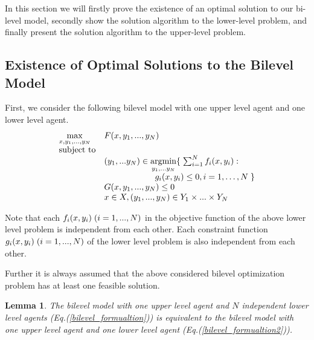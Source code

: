 \documentclass[10pt,journal]{IEEEtran}
\theoremstyle{definition}
\theoremstyle{plain} \newtheorem{theo}{Theorem} \newtheorem{prop}{Proposition}  \newtheorem{lemm}{Lemma}
\begin{document}
In this section we will firstly prove the existence of an optimal solution to our bi-level model, secondly show the solution algorithm to the lower-level problem, and finally present the solution algorithm to the upper-level problem. 









\subsection{Existence of Optimal Solutions to the Bilevel Model} \label{existence}
First, we consider the following bilevel model with one upper level agent and one lower level agent. \\

\vspace{-1cm}
\begin{equation}  \label{bilevel_formualtion2}
\begin{array}{ll} 
\max \limits_{x,y_{1},...,y_N}& F(x,y_{1},...,y_N) \\ 
\hbox{subject to} & \\ 
& (y_1,...y_N) \in \underset{y_1,...y_N} {\operatorname{argmin}} \lbrace \hspace{1mm} \sum_{i=1}^N f_i(x,y_i): \\
& \quad \quad \quad \quad \quad \quad g_i(x,y_i)\leq 0, i=1,\dots,N \hspace{1mm} \rbrace\\ & G(x,y_{1},...,y_N)\leq 0 \\ & x\in X, (y_1,..., y_N) \in Y_1 \times ... \times Y_N 
\end{array}
\end{equation}

Note that each $f_i(x,y_i) \hspace{0.1cm} (i =1,...,N)$ in the objective function of the above lower level problem is independent from each other. Each constraint function $g_i(x,y_i) \hspace{0.1cm} (i =1,...,N)$ of the lower level problem is also independent from each other.

Further it is always assumed that the above considered bilevel optimization problem has at least one feasible solution. 







\begin{lemm} \label{lemma} 
The bilevel model with one upper level agent and $N$ independent lower level agents (Eq.(\ref{bilevel_formualtion})) is equivalent to the bilevel model with one upper level agent and one lower level agent (Eq.(\ref{bilevel_formualtion2})).
\end{lemm}
\end{document}
